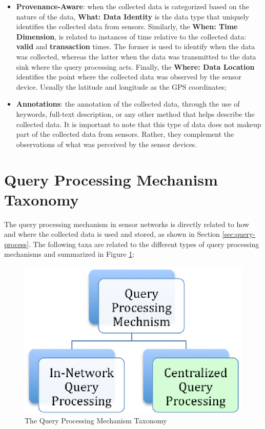 \begin{itemize}
  \item \textbf{Provenance-Aware}: when the collected data is categorized based
  on the nature of the data, \textbf{What: Data Identity} is the data type
  that uniquely identifies the collected data from sensors. Similarly, the
  \textbf{When: Time Dimension}, is related to instances of time relative to the
  collected data: \textbf{valid} and \textbf{transaction} times. The former is
  used to identify when the data was collected, whereas the latter when the data was
  transmitted to the data sink where the query processing acts. Finally, the
  \textbf{Where: Data Location} identifies the point where the collected data
  was observed by the sensor device. Usually the latitude and longitude as the
  GPS coordinates;
  \item \textbf{Annotations}: the annotation of the collected data, through the
  use of keywords, full-text description, or any other method that helps
  describe the collected data. It is important to note that this type of data
  does not makeup part of the collected data from sensors. Rather, they
  complement the observations of what was perceived by the sensor devices.
\end{itemize}

\section{Query Processing Mechanism Taxonomy}

The query processing mechanism in sensor networks is directly related to how
and where the collected data is used and stored, as shown in Section
\ref{sec:query-process}. The following taxa are related to the
different types of query processing mechanisms and summarized in Figure
\ref{fig:taxonomy-query-mechanism}:

\begin{figure}[h]
  \centering
  \includegraphics{../diagrams/taxonomy-query-mechanism}
  \caption{The Query Processing Mechanism Taxonomy}
  \label{fig:taxonomy-query-mechanism}
\end{figure}

